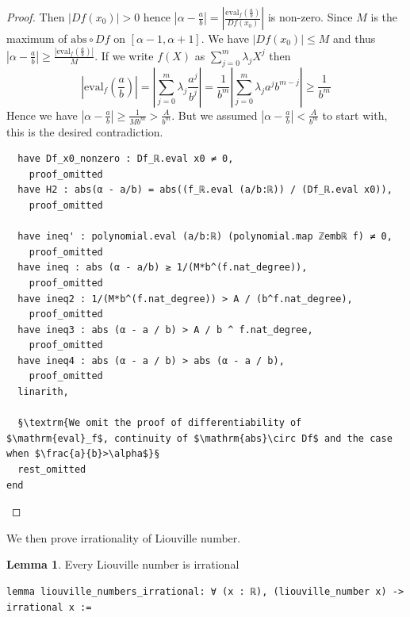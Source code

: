 \documentclass{report}
\theoremstyle{definition}
\newtheorem{lemma}{Lemma}[section]
\begin{document}
\begin{proof}
Then $|Df(x_0)|>0$ hence $\left|\alpha-\frac ab\right|=\left|\frac{\mathrm{eval}_f(\frac a b)}{Df(x_0)}\right|$ is non-zero. Since $M$ is the maximum of $\mathrm{abs}\circ Df$ on $[\alpha-1,\alpha+1]$. We have $|Df(x_0)|\le M$ and thus $\left|\alpha-\frac ab\right|\ge \frac{|\mathrm{eval}_f(\frac a b)|}{M}$. If we write $f(X)$ as $\sum_{j=0}^m \lambda_j X^j$ then
\begin{equation*}
\left|\mathrm{eval}_f\left(\frac a b\right)\right|=\left|\sum_{j=0}^m\lambda_j \frac{a^j}{b^j}\right|= \frac1{b^m}\left|\sum_{j=0}^m\lambda_j a^jb^{m-j}\right|\ge\frac1{b^m}
\end{equation*}
Hence we have $\left|\alpha-\frac a b\right|\ge \frac1{Mb^m}>\frac{A}{b^m}$. But we assumed $\left|\alpha-\frac ab\right|<\frac A{b^m}$ to start with, this is the desired contradiction.

\begin{verbatim}
  have Df_x0_nonzero : Df_ℝ.eval x0 ≠ 0,
    proof_omitted
  have H2 : abs(α - a/b) = abs((f_ℝ.eval (a/b:ℝ)) / (Df_ℝ.eval x0)),
    proof_omitted

  have ineq' : polynomial.eval (a/b:ℝ) (polynomial.map ℤembℝ f) ≠ 0,
    proof_omitted
  have ineq : abs (α - a/b) ≥ 1/(M*b^(f.nat_degree)),
    proof_omitted
  have ineq2 : 1/(M*b^(f.nat_degree)) > A / (b^f.nat_degree),
    proof_omitted
  have ineq3 : abs (α - a / b) > A / b ^ f.nat_degree,
    proof_omitted
  have ineq4 : abs (α - a / b) > abs (α - a / b),
    proof_omitted 
  linarith,
  
  §\textrm{We omit the proof of differentiability of $\mathrm{eval}_f$, continuity of $\mathrm{abs}\circ Df$ and the case when $\frac{a}{b}>\alpha$}§
  rest_omitted
end
\end{verbatim}
\end{proof}

We then prove irrationality of Liouville number. 
\begin{lemma}
Every Liouville number is irrational
\begin{verbatim} 
lemma liouville_numbers_irrational: ∀ (x : ℝ), (liouville_number x) -> irrational x :=
\end{verbatim}
\end{lemma}
\end{document}
